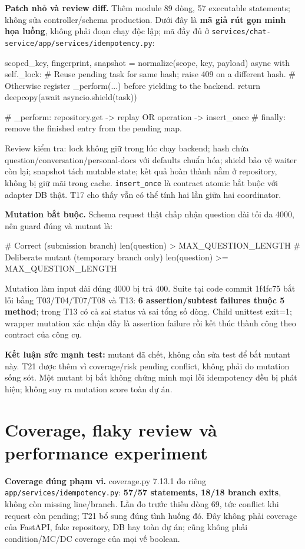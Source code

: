 \documentclass[11pt,a4paper]{article}
\DeclareRobustCommand{\code}[1]{\nolinkurl{#1}}
\begin{document}
\textbf{Patch nhỏ và review diff.} Thêm module 89 dòng, 57 executable statements; không sửa controller/schema production. Dưới đây là \textbf{mã giả rút gọn minh họa luồng}, không phải đoạn chạy độc lập; mã đầy đủ ở \code{services/chat-service/app/services/idempotency.py}:
\begin{Code}
scoped_key, fingerprint, snapshot = normalize(scope, key, payload)
async with self._lock:
    # Reuse pending task for same hash; raise 409 on a different hash.
    # Otherwise register _perform(...) before yielding to the backend.
return deepcopy(await asyncio.shield(task))

# _perform: repository.get -> replay OR operation -> insert_once
# finally: remove the finished entry from the pending map.
\end{Code}
Review kiểm tra: lock không giữ trong lúc chạy backend; hash chứa question/conversation/personal-docs với defaults chuẩn hóa; shield bảo vệ waiter còn lại; snapshot tách mutable state; kết quả hoàn thành nằm ở repository, không bị giữ mãi trong cache. \code{insert_once} là contract atomic bắt buộc với adapter DB thật. T17 cho thấy vẫn có thể tính hai lần giữa hai coordinator.

\textbf{Mutation bắt buộc.} Schema request thật chấp nhận question dài tối đa 4000, nên guard đúng và mutant là:
\begin{Code}
# Correct (submission branch)
len(question) > MAX_QUESTION_LENGTH
# Deliberate mutant (temporary branch only)
len(question) >= MAX_QUESTION_LENGTH
\end{Code}
Mutation làm input dài đúng 4000 bị trả 400. Suite tại code commit 1f4fc75 bắt lỗi bằng T03/T04/T07/T08 và T13: \textbf{6 assertion/subtest failures thuộc 5 method}; trong T13 có cả sai status và sai tổng số dòng. Child unittest exit=1; wrapper mutation xác nhận đây là assertion failure rồi kết thúc thành công theo contract của công cụ.

\textbf{Kết luận sức mạnh test:} mutant đã chết, không cần sửa test để bắt mutant này. T21 được thêm vì coverage/risk pending conflict, không phải do mutation sống sót. Một mutant bị bắt không chứng minh mọi lỗi idempotency đều bị phát hiện; không suy ra mutation score toàn dự án.

\newpage
\section{Coverage, flaky review và performance experiment}
\textbf{Coverage đúng phạm vi.} coverage.py 7.13.1 đo riêng \code{app/services/idempotency.py}: \textbf{57/57 statements, 18/18 branch exits}, không còn missing line/branch. Lần đo trước thiếu dòng 69, tức conflict khi request còn pending; T21 bổ sung đúng tình huống đó. Đây không phải coverage của FastAPI, fake repository, DB hay toàn dự án; cũng không phải condition/MC/DC coverage của mọi vế boolean.
\end{document}
